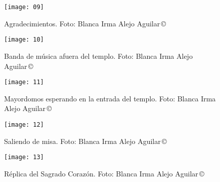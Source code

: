 \documentclass[14pt,letterpaper,twoside]{extbook} %
\begin{document}
\begin{figure}
\centering
\texttt{[image: 09]}
\renewcommand{\figurename}{Imagen}
\caption[Agradecimientos]{Agradecimientos. Foto: Blanca Irma Alejo Aguilar\,\copyright}
\label{agradecimientos}
\end{figure}


\begin{figure}
\centering
\texttt{[image: 10]}
\renewcommand{\figurename}{Imagen}
\caption[Banda de música afuera del templo]{Banda de música afuera del templo. Foto: Blanca Irma Alejo Aguilar\,\copyright}
\label{banda_de_musica}
\end{figure}


\begin{figure}
\centering
\texttt{[image: 11]}
\renewcommand{\figurename}{Imagen}
\caption[Mayordomos esperando en la entrada del templo]{Mayordomos esperando en la entrada del templo. Foto: Blanca Irma Alejo Aguilar\,\copyright}
\label{mayordomos_esperando_frente_templo}
\end{figure}


\begin{figure}
\centering
\texttt{[image: 12]}
\renewcommand{\figurename}{Imagen}
\caption[Saliendo de misa]{Saliendo de misa. Foto: Blanca Irma Alejo Aguilar\,\copyright}
\label{saliendo_de_misa_2}
\end{figure}


\begin{figure}
\centering
\texttt{[image: 13]}
\renewcommand{\figurename}{Imagen}
\caption[Réplica del Sagrado Corazón]{Réplica del Sagrado Corazón. Foto: Blanca Irma Alejo Aguilar\,\copyright}
\label{replica_del_sagrado_corazón}
\end{figure}

\end{document}
